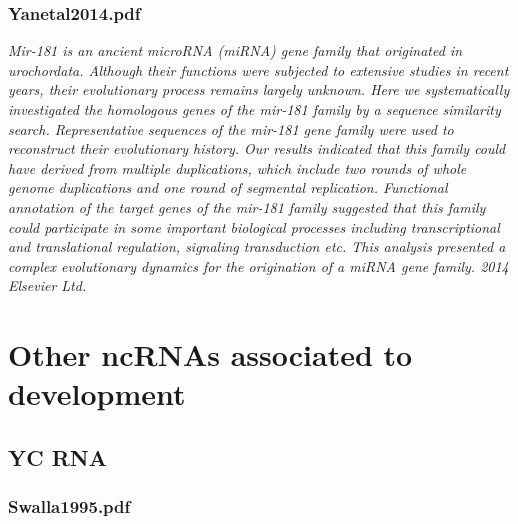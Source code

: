 \subsubsection{Yanetal2014.pdf}

\cite{Yang2014}
\textit{Mir-181 is an ancient microRNA (miRNA) gene family that originated in urochordata. Although their functions were subjected to extensive studies in recent years, their evolutionary process remains largely unknown. Here we systematically investigated the homologous genes of the mir-181 family by a sequence similarity search. Representative sequences of the mir-181 gene family were used to reconstruct their evolutionary history. Our results indicated that this family could have derived from multiple duplications, which include two rounds of whole genome duplications and one round of segmental replication. Functional annotation of the target genes of the mir-181 family suggested that this family could participate in some important biological processes including transcriptional and translational regulation, signaling transduction etc. This analysis presented a complex evolutionary dynamics for the origination of a miRNA gene family. {\textcopyright} 2014 Elsevier Ltd.}


\section{Other ncRNAs associated to development}
\subsection{YC RNA}
\subsubsection{Swalla1995.pdf}

